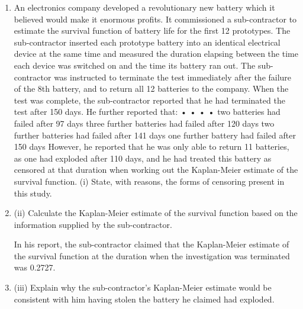 \documentclass[a4paper,12pt]{article}
\begin{document}
\begin{enumerate}

\item An electronics company developed a revolutionary new battery which it believed
would make it enormous profits. It commissioned a sub-contractor to estimate the
survival function of battery life for the first 12 prototypes. The sub-contractor
inserted each prototype battery into an identical electrical device at the same time and
measured the duration elapsing between the time each device was switched on and the time its battery ran out. The sub-contractor was instructed to terminate the test
immediately after the failure of the 8th battery, and to return all 12 batteries to the
company.
When the test was complete, the sub-contractor reported that he had terminated the
test after 150 days. He further reported that:
•
•
•
•
two batteries had failed after 97 days
three further batteries had failed after 120 days
two further batteries had failed after 141 days
one further battery had failed after 150 days
However, he reported that he was only able to return 11 batteries, as one had exploded
after 110 days, and he had treated this battery as censored at that duration when
working out the Kaplan-Meier estimate of the survival function.
(i) State, with reasons, the forms of censoring present in this study.

\item (ii) Calculate the Kaplan-Meier estimate of the survival function based on the
information supplied by the sub-contractor.

In his report, the sub-contractor claimed that the Kaplan-Meier estimate of the
survival function at the duration when the investigation was terminated was 0.2727.
\item (iii)
Explain why the sub-contractor’s Kaplan-Meier estimate would be consistent
with him having stolen the battery he claimed had exploded.


\end{enumerate}
\end{document}
